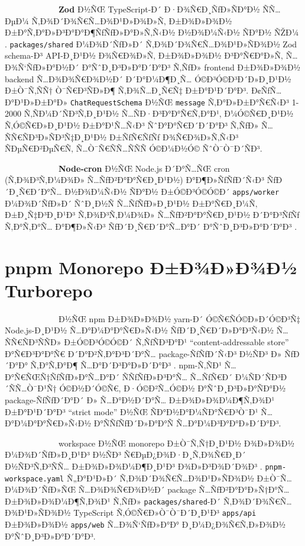\documentclass[12pt,A4]{report}
\begin{document}
\ \ \ \ \ \ \ \ \  \ \ \ \ \textbf{Zod} Ð½ÑŒ TypeScript-Ð´ Ð·Ð¾Ñ€Ð¸ÑƒÐ»ÑÐ°Ð½
ÑÑ…ÐµÐ¼ Ñ‚Ð¾Ð´Ð¾Ñ€Ñ…Ð¾Ð¹Ð»Ð¾Ð»Ñ‚ Ð±Ð¾Ð»Ð¾Ð½ Ð±Ð°Ñ‚Ð°Ð»Ð³Ð°Ð°Ð¶ÑƒÑƒÐ»Ð°Ð»Ñ‚Ñ‹Ð½ Ð½Ð¾Ð¼Ñ‹Ð½ ÑÐ°Ð½ ÑŽÐ¼
\cite{zod2024}. \texttt{packages/shared} Ð¼Ð¾Ð´ÑƒÐ»Ð´ Ñ‚Ð¾Ð´Ð¾Ñ€Ñ…Ð¾Ð¹Ð»ÑÐ¾Ð½
Zod schema-Ð³ API-Ð¸Ð¹Ð½ Ð¾Ñ€Ð¾Ð»Ñ‚ Ð±Ð¾Ð»Ð¾Ð½ Ð³Ð°Ñ€Ð°Ð»Ñ‚ Ñ…Ð¾Ñ‘ÑƒÐ»Ð°Ð½Ð´ Ð°ÑˆÐ¸Ð³Ð»Ð°Ð´Ð°Ð³ Ñ‚ÑƒÐ»
frontend Ð±Ð¾Ð»Ð¾Ð½ backend Ñ…Ð¾Ð¾Ñ€Ð¾Ð½Ð´ Ð´Ð°Ð¼Ð¶Ð¸Ñ… Ó©Ð³Ó©Ð³Ð´Ð»Ð¸Ð¹Ð½ Ð±Ò¯Ñ‚ÑÑ† Ò¯Ñ€Ð³ÑÐ»Ð¶
Ñ‚Ð¾Ñ…Ð¸Ñ€Ñ‡ Ð±Ð°Ð¹Ð´Ð°Ð³. Ð¢ÑƒÑ…Ð°Ð¹Ð»Ð±Ð°Ð» \texttt{ChatRequestSchema} Ð½ÑŒ
\texttt{message} Ñ‚Ð°Ð»Ð±Ð°Ñ€Ñ‹Ð³ 1-2000 Ñ‚ÑÐ¼Ð´ÑÐ³Ñ‚Ð¸Ð¹Ð½ Ñ…ÑÐ·Ð³Ð°Ð°Ñ€Ñ‚Ð°Ð¹, Ð¼Ó©Ñ€Ð¸Ð¹Ð½
Ñ‚Ó©Ñ€Ð»Ð¸Ð¹Ð½ Ð±Ð°Ð¹Ñ…Ñ‹Ð³ ÑˆÐ°Ð°Ñ€Ð´Ð´Ð°Ð³ Ñ‚ÑƒÐ» Ñ…ÑÑ€ÑÐ³Ð»ÑÐ³Ñ‡Ð¸Ð¹Ð½ Ð±ÑƒÑ€ÑƒÑƒ Ð¾Ñ€Ð¾Ð»Ñ‚Ñ‹Ð³ ÑÐµÑ€Ð²ÐµÑ€Ñ‚
Ñ…Ò¯Ñ€ÑÑ…ÑÑÑ Ó©Ð¼Ð½Ó© ÑˆÒ¯Ò¯Ð´ÑÐ³.

\ \ \ \ \ \ \ \ \  \ \ \ \ \textbf{Node-cron} Ð½ÑŒ Node.js Ð´Ð°Ñ…ÑŒ cron
(Ñ‚Ð¾Ð³Ñ‚Ð¼Ð¾Ð» Ñ…ÑƒÐ²Ð°Ð°Ñ€Ð¸Ð¹Ð½) Ð°Ð¶Ð»ÑƒÑƒÐ´Ñ‹Ð³ ÑƒÐ´Ð¸Ñ€Ð´Ð°Ñ… Ð½Ð¾Ð¼Ñ‹Ð½ ÑÐ°Ð½ Ð±Ó©Ð³Ó©Ó©Ð´
\texttt{apps/worker} Ð¼Ð¾Ð´ÑƒÐ»Ð´ ÑˆÐ¸Ð½Ñ Ñ…ÑƒÑƒÐ»Ð¸Ð¹Ð½ Ð±Ð°Ñ€Ð¸Ð¼Ñ‚ Ð±Ð¸Ñ‡Ð³Ð¸Ð¹Ð³ Ñ‚Ð¾Ð³Ñ‚Ð¼Ð¾Ð»
Ñ…ÑƒÐ²Ð°Ð°Ñ€Ð¸Ð¹Ð½ Ð´Ð°Ð³ÑƒÑƒ Ñ‚Ð°Ñ‚Ð°Ñ… Ð°Ð¶Ð»Ñ‹Ð³ ÑƒÐ´Ð¸Ñ€Ð´Ð°Ñ…Ð°Ð´ Ð°ÑˆÐ¸Ð³Ð»Ð°Ð´Ð°Ð³ \cite{nodecron2024}.

\section{pnpm Monorepo Ð±Ð¾Ð»Ð¾Ð½ Turborepo}

\ \ \ \ \ \ \ \ \  \ \ \ \ \pnpm Ð½ÑŒ npm Ð±Ð¾Ð»Ð¾Ð½ yarn-Ð´
Ó©Ñ€ÑÓ©Ð»Ð´Ó©Ð³Ñ‡ Node.js-Ð¸Ð¹Ð½ Ñ…Ð°Ð¼Ð°Ð°Ñ€Ð»Ñ‹Ð½ ÑƒÐ´Ð¸Ñ€Ð´Ð»Ð°Ð³Ñ‹Ð½ Ñ…ÑÑ€ÑÐ³ÑÑÐ» Ð±Ó©Ð³Ó©Ó©Ð´
Ñ‚ÑƒÑÐ³Ð°Ð¹ ``content-addressable store'' Ð°Ñ€Ð³Ð°Ð°Ñ€ Ð´Ð°Ð²Ñ‚Ð°Ð³Ð´Ð°Ñ…
package-ÑƒÑƒÐ´Ñ‹Ð³ Ð½ÑÐ³ Ð» ÑƒÐ´Ð°Ð° Ñ‚Ð°Ñ‚Ð°Ð¶ Ñ…Ð°Ð´Ð³Ð°Ð»Ð´Ð°Ð³ \cite{pnpm2024}.
npm-Ñ‚ÑÐ¹ Ñ…Ð°Ñ€ÑŒÑ†ÑƒÑƒÐ»Ð°Ñ…Ð°Ð´ ÑÑƒÑƒÐ»Ð³Ð°Ñ… Ñ…ÑƒÑ€Ð´ Ð¼ÑÐ´ÑÐ³Ð´ÑÑ…Ò¯Ð¹Ñ† Ó©Ð½Ð´Ó©Ñ€, Ð·Ó©Ð²Ñ…Ó©Ð½
Ð°ÑˆÐ¸Ð³Ð»Ð°ÑÐ°Ð½ package-ÑƒÑƒÐ´Ð°Ð´ Ð» Ñ…Ð°Ð½Ð´Ð°Ñ… Ð±Ð¾Ð»Ð¾Ð¼Ð¶Ñ‚Ð¾Ð¹ Ð±Ð°Ð¹Ð´Ð°Ð³ ``strict
mode'' Ð½ÑŒ ÑÐ°Ð½Ð°Ð¼ÑÐ°Ñ€Ð³Ò¯Ð¹ Ñ…Ð°Ð¼Ð°Ð°Ñ€Ð»Ñ‹Ð½ Ð°ÑÑƒÑƒÐ´Ð»Ð°Ð°Ñ Ñ…Ð°Ð¼Ð³Ð°Ð°Ð»Ð´Ð°Ð³.

\ \ \ \ \ \ \ \ \  \ \ \ \ \pnpm workspace Ð½ÑŒ monorepo
Ð±Ò¯Ñ‚Ñ†Ð¸Ð¹Ð½ Ð¾Ð»Ð¾Ð½ Ð¼Ð¾Ð´ÑƒÐ»Ð¸Ð¹Ð³ Ð½ÑÐ³ Ñ€ÐµÐ¿Ð¾Ð·Ð¸Ñ‚Ð¾Ñ€Ð¸Ð´ Ð½ÑÐ³Ñ‚Ð³ÑÑ… Ð±Ð¾Ð»Ð¾Ð¼Ð¶Ð¸Ð¹Ð³
Ð¾Ð»Ð³Ð¾Ð´Ð¾Ð³ \cite{pnpm2024}. \texttt{pnpm-workspace.yaml}
Ñ„Ð°Ð¹Ð»Ð´ Ñ‚Ð¾Ð´Ð¾Ñ€Ñ…Ð¾Ð¹Ð»ÑÐ¾Ð½ Ð±Ò¯Ñ… Ð¼Ð¾Ð´ÑƒÐ»ÑŒ Ñ…Ð¾Ð¾Ñ€Ð¾Ð½Ð´ package Ñ…ÑƒÐ²Ð°Ð°Ð»Ñ†Ð°Ñ…
Ð±Ð¾Ð»Ð¾Ð¼Ð¶Ñ‚Ð¾Ð¹ Ñ‚ÑƒÐ» \texttt{packages/shared}-Ð´ Ñ‚Ð¾Ð´Ð¾Ñ€Ñ…Ð¾Ð¹Ð»ÑÐ¾Ð½
TypeScript Ñ‚Ó©Ñ€Ð»Ò¯Ò¯Ð´Ð¸Ð¹Ð³ \texttt{apps/api} Ð±Ð¾Ð»Ð¾Ð½ \texttt{apps/web}
Ñ…Ð¾Ñ‘ÑƒÐ»Ð°Ð° Ð¸Ð¼Ð¿Ð¾Ñ€Ñ‚Ð»Ð¾Ð½ Ð°ÑˆÐ¸Ð³Ð»Ð°Ð´Ð°Ð³.
\end{document}
